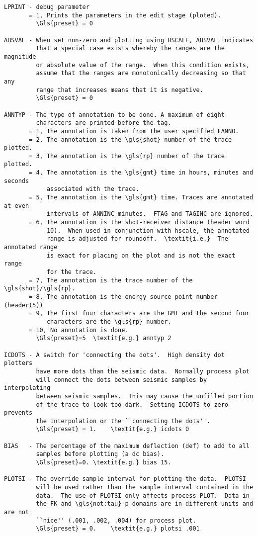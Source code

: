 \begin{verbatim}
LPRINT - debug parameter
       = 1, Prints the parameters in the edit stage (ploted).
         \Gls{preset} = 0

ABSVAL - When set non-zero and plotting using HSCALE, ABSVAL indicates
         that a special case exists whereby the ranges are the magnitude
         or absolute value of the range.  When this condition exists,
         assume that the ranges are monotonically decreasing so that any
         range that increases means that it is negative.
         \Gls{preset} = 0

ANNTYP - The type of annotation to be done. A maximum of eight
         characters are printed before the tag.
       = 1, The annotation is taken from the user specified FANNO.
       = 2, The annotation is the \gls{shot} number of the trace plotted.
       = 3, The annotation is the \gls{rp} number of the trace plotted.
       = 4, The annotation is the \gls{gmt} time in hours, minutes and seconds
            associated with the trace.
       = 5, The annotation is the \gls{gmt} time. Traces are annotated at even
            intervals of ANNINC minutes.  FTAG and TAGINC are ignored.
       = 6, The annotation is the shot-receiver distance (header word
            10).  When used in conjunction with hscale, the annotated
            range is adjusted for roundoff.  \textit{i.e.}  The annotated range
            is exact for placing on the plot and is not the exact range
            for the trace.
       = 7, The annotation is the trace number of the \gls{shot}/\gls{rp}.
       = 8, The annotation is the energy source point number (header(5))
       = 9, The first four characters are the GMT and the second four
            characters are the \gls{rp} number.
       = 10, No annotation is done.
         \Gls{preset}=5  \textit{e.g.} anntyp 2

ICDOTS - A switch for 'connecting the dots'.  High density dot plotters
         have more dots than the seismic data.  Normally process plot
         will connect the dots between seismic samples by interpolating
         between seismic samples.  This may cause the unfilled portion
         of the trace to look too dark.  Setting ICDOTS to zero prevents
         the interpolation or the ``connecting the dots''.
         \Gls{preset} = 1.    \textit{e.g.} icdots 0

BIAS   - The percentage of the maximum deflection (def) to add to all
         samples before plotting (a dc bias).
         \Gls{preset}=0. \textit{e.g.} bias 15.

PLOTSI - The override sample interval for plotting the data.  PLOTSI
         will be used rather than the sample interval contained in the
         data.  The use of PLOTSI only affects process PLOT.  Data in
         the FK and \gls{not:tau}-p domains are in different units and are not
         ``nice'' (.001, .002, .004) for process plot.
         \Gls{preset} = 0.    \textit{e.g.} plotsi .001


\end{verbatim}
